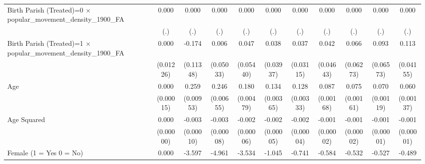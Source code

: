 {\begin{tabular}{l*{10}{c}}
Birth Parish (Treated)=0 $\times$ popular\_movement\_density\_1900\_FA&       0.000         &       0.000         &       0.000         &       0.000         &       0.000         &       0.000         &       0.000         &       0.000         &       0.000         &       0.000         \\
                    &         (.)         &         (.)         &         (.)         &         (.)         &         (.)         &         (.)         &         (.)         &         (.)         &         (.)         &         (.)         \\
Birth Parish (Treated)=1 $\times$ popular\_movement\_density\_1900\_FA&       0.000         &      -0.174         &       0.006         &       0.047         &       0.038         &       0.037         &       0.042         &       0.066         &       0.093         &       0.113\sym{**} \\
                    &   (0.01226)         &   (0.11348)         &   (0.05033)         &   (0.05440)         &   (0.03937)         &   (0.03115)         &   (0.04643)         &   (0.06273)         &   (0.06573)         &   (0.04155)         \\
Age                 &       0.000         &       0.259\sym{***}&       0.246\sym{***}&       0.180\sym{***}&       0.134\sym{***}&       0.128\sym{***}&       0.087\sym{***}&       0.075\sym{***}&       0.070\sym{***}&       0.060\sym{***}\\
                    &   (0.00015)         &   (0.00953)         &   (0.00655)         &   (0.00479)         &   (0.00365)         &   (0.00333)         &   (0.00168)         &   (0.00161)         &   (0.00119)         &   (0.00137)         \\
Age Squared         &       0.000         &      -0.003\sym{***}&      -0.003\sym{***}&      -0.002\sym{***}&      -0.002\sym{***}&      -0.002\sym{***}&      -0.001\sym{***}&      -0.001\sym{***}&      -0.001\sym{***}&      -0.001\sym{***}\\
                    &   (0.00000)         &   (0.00010)         &   (0.00008)         &   (0.00006)         &   (0.00005)         &   (0.00004)         &   (0.00002)         &   (0.00002)         &   (0.00001)         &   (0.00001)         \\
Female (1 = Yes 0 = No)&       0.000         &      -3.597\sym{***}&      -4.961\sym{***}&      -3.534\sym{***}&      -1.045\sym{***}&      -0.741\sym{***}&      -0.584\sym{***}&      -0.532\sym{***}&      -0.527\sym{***}&      -0.489\sym{***}\\

\end{tabular}}
